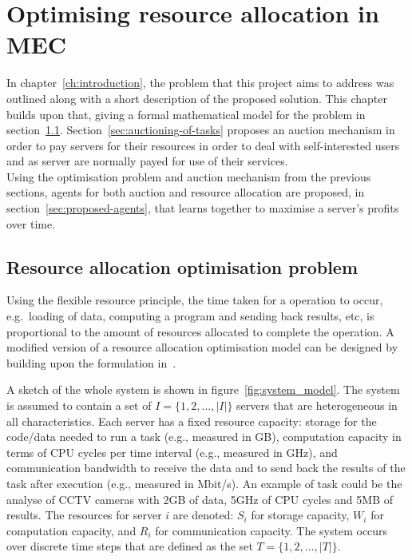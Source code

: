 
\chapter{Optimising resource allocation in MEC}\label{ch:optimising-resource-allocation-in-mec}
In chapter~\ref{ch:introduction}, the problem that this project aims to address was outlined along with a short
description of the proposed solution. This chapter builds upon that, giving a formal mathematical model for the problem
in section~\ref{sec:optimisation-problem}. Section~\ref{sec:auctioning-of-tasks} proposes an auction mechanism in order
to pay servers for their resources in order to deal with self-interested users and as server are normally payed for
use of their services. \\
Using the optimisation problem and auction mechanism from the previous sections, agents for both auction and resource
allocation are proposed, in section~\ref{sec:proposed-agents}, that learns together to maximise a server's profits
over time.

\section{Resource allocation optimisation problem}\label{sec:optimisation-problem}
Using the flexible resource principle, the time taken for a operation to occur, e.g.\ loading of data, computing
a program and sending back results, etc, is proportional to the amount of resources allocated to complete the operation.
A modified version of a resource allocation optimisation model can be designed by building upon the formulation
in~\cite{FlexibleResourceAllocation}.

A sketch of the whole system is shown in figure~\ref{fig:system_model}.
The system is assumed to contain a set of $I = \{1,2,\ldots,\left|I\right|\}$ servers that are heterogeneous in all
characteristics. Each server has a fixed resource capacity: storage for the code/data needed to run a task
(e.g., measured in GB), computation capacity in terms of CPU cycles per time interval (e.g., measured in GHz),
and communication bandwidth to receive the data and to send back the results of the task after execution
(e.g., measured in Mbit/s). An example of task could be the analyse of CCTV cameras with 2GB of data, 5GHz of CPU
cycles and 5MB of results. The resources for server $i$ are denoted: $S_i$ for storage capacity, $W_i$ for computation
capacity, and $R_i$ for communication capacity. The system occurs over discrete time steps that are defined as the set
$T = \{1,2,\ldots,\left|T\right|\}$.

